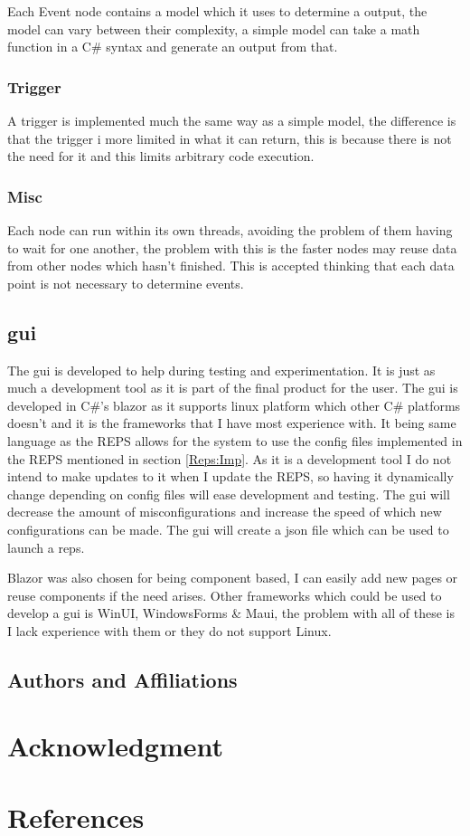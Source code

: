 \documentclass[conference]{IEEEtran}
\begin{document}
				
				Each Event node contains a model which it uses to determine a output, the model can vary between their complexity, a simple model can take a math function in a C\# syntax and generate an output from that.
				
			\subsubsection{Trigger}
				A trigger is implemented much the same way as a simple model, the difference is that the trigger i more limited in what it can return, this is because there is not the need for it and this limits arbitrary code execution.
			
			\subsubsection{Misc}
				Each node can run within its own threads, avoiding the problem of them having to wait for one another, the problem with this is the faster nodes may reuse data from other nodes which hasn't finished. This is accepted thinking that each data point is not necessary to determine events.
	
		\subsection{\gls{gui}}
			The \gls{gui} is developed to help during testing and experimentation. It is just as much a development tool as it is part of the final product for the user. The \gls{gui} is developed in C\#'s blazor as it supports linux platform which other C\# platforms doesn't and it is the frameworks that I have most experience with. It being same language as the REPS allows for the system to use the config files implemented in the REPS mentioned in section \ref{Reps:Imp}. As it is a development tool I do not intend to make updates to it when I update the REPS, so having it dynamically change depending on config files will ease development and testing. The \gls{gui} will decrease the amount of misconfigurations and increase the speed of which new configurations can be made. The \gls{gui} will create a json file which can be used to launch a \gls{reps}.
			
			Blazor was also chosen for being component based, I can easily add new pages or reuse components if the need arises.
			Other frameworks which could be used to develop a \gls{gui} is WinUI, WindowsForms \& Maui, the problem with all of these is I lack experience with them or they do not support Linux.
			
	
	\subsection{Authors and Affiliations}

	
	\section{Acknowledgment}
	
	\section*{References}
	
	
\end{document}
